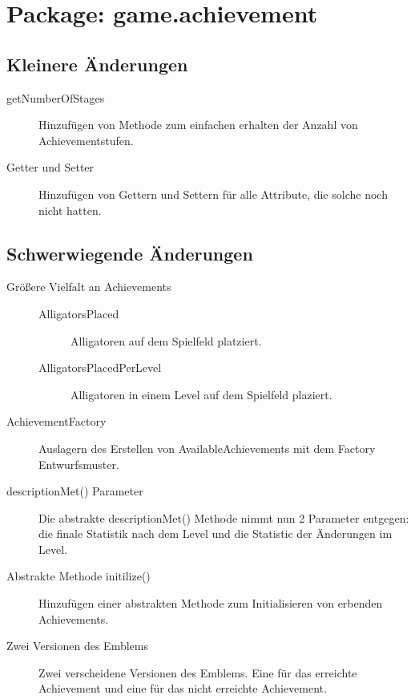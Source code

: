 \section{Package: game.achievement}

\subsection{Kleinere Änderungen}

	\begin{description}
		\item[getNumberOfStages]
		Hinzufügen von Methode zum einfachen erhalten der Anzahl von Achievementstufen.
		\item[Getter und Setter]
		Hinzufügen von Gettern und Settern für alle Attribute, die solche noch nicht hatten.

	\end{description}

\subsection{Schwerwiegende Änderungen}

	\begin{description}
		\item[Größere Vielfalt an Achievements]
		\begin {description}
			\item[AlligatorsPlaced]
			Alligatoren auf dem Spielfeld platziert.
			\item[AlligatorsPlacedPerLevel]
			Alligatoren in einem Level auf dem Spielfeld plaziert.
		\end {description}

		\item[AchievementFactory]
		Auslagern des Erstellen von AvailableAchievements mit dem Factory Entwurfsmuster.
		
		\item[descriptionMet() Parameter]	
		Die abstrakte descriptionMet() Methode nimmt nun 2 Parameter entgegen: die finale Statistik nach dem Level und die Statistic der Änderungen im Level.		

		\item[Abstrakte Methode initilize()]
		Hinzufügen einer abstrakten Methode zum Initialisieren von erbenden Achievements.

		\item[Zwei Versionen des Emblems]
		Zwei verscheidene Versionen des Emblems. Eine für das erreichte Achievement und eine für das nicht erreichte Achievement.

	\end{description}
